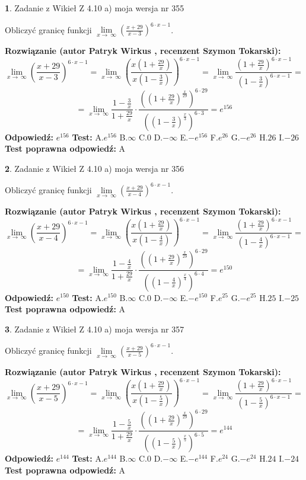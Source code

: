 \documentclass[12pt, a4paper]{article}
\theoremstyle{definition} %
\newtheorem{zad}{}
\newcommand{\zadStart}[1]{\begin{zad}#1\newline}
\newcommand{\zadStop}{\end{zad}}
\newcommand{\rozwStart}[2]{\noindent \textbf{Rozwiązanie (autor #1 , recenzent #2): }\newline}
\newcommand{\rozwStop}{\newline}
\newcommand{\odpStart}{\noindent \textbf{Odpowiedź:}\newline}
\newcommand{\odpStop}{\newline}
\newcommand{\testStart}{\noindent \textbf{Test:}\newline}
\newcommand{\testStop}{\newline}
\newcommand{\kluczStart}{\noindent \textbf{Test poprawna odpowiedź:}\newline}
\newcommand{\kluczStop}{\newline}
\begin{document}
\zadStart{Zadanie z Wikieł Z 4.10 a) moja wersja nr 355}

Obliczyć granicę funkcji  $\lim\limits_{x\to\ \infty}(\frac{x+29}{x-3})^{6\cdot x-1}$.
\zadStop
\rozwStart{Patryk Wirkus}{Szymon Tokarski}
$$\lim\limits_{x\to\ \infty}(\frac{x+29}{x-3})^{6\cdot x-1} = \lim\limits_{x\to\ \infty}(\frac{x(1+\frac{29}{x})}{x(1-\frac{3}{x})})^{6\cdot x-1}=\lim\limits_{x\to\ \infty}\frac{(1+\frac{29}{x})^{6\cdot x-1}}{(1-\frac{3}{x})^{6\cdot x-1}}=$$
$$=\lim\limits_{x\to\ \infty}\frac{1-\frac{3}{x}}{1+\frac{29}{x}}\cdot\frac{((1+\frac{29}{x})^{\frac{x}{29}})^{6\cdot29}}{((1-\frac{3}{x})^{\frac{x}{3}})^{6\cdot3}}=e^{156}$$
\rozwStop
\odpStart
$e^{156}$
\odpStop
\testStart
A.$e^{156}$ B.$\infty$ C.$0$ D.$-\infty$ E.$-e^{156}$
F.$e^{26}$ G.$-e^{26}$
H.$26$
I.$-26$
\testStop
\kluczStart
A
\kluczStop



\zadStart{Zadanie z Wikieł Z 4.10 a) moja wersja nr 356}

Obliczyć granicę funkcji  $\lim\limits_{x\to\ \infty}(\frac{x+29}{x-4})^{6\cdot x-1}$.
\zadStop
\rozwStart{Patryk Wirkus}{Szymon Tokarski}
$$\lim\limits_{x\to\ \infty}(\frac{x+29}{x-4})^{6\cdot x-1} = \lim\limits_{x\to\ \infty}(\frac{x(1+\frac{29}{x})}{x(1-\frac{4}{x})})^{6\cdot x-1}=\lim\limits_{x\to\ \infty}\frac{(1+\frac{29}{x})^{6\cdot x-1}}{(1-\frac{4}{x})^{6\cdot x-1}}=$$
$$=\lim\limits_{x\to\ \infty}\frac{1-\frac{4}{x}}{1+\frac{29}{x}}\cdot\frac{((1+\frac{29}{x})^{\frac{x}{29}})^{6\cdot29}}{((1-\frac{4}{x})^{\frac{x}{4}})^{6\cdot4}}=e^{150}$$
\rozwStop
\odpStart
$e^{150}$
\odpStop
\testStart
A.$e^{150}$ B.$\infty$ C.$0$ D.$-\infty$ E.$-e^{150}$
F.$e^{25}$ G.$-e^{25}$
H.$25$
I.$-25$
\testStop
\kluczStart
A
\kluczStop



\zadStart{Zadanie z Wikieł Z 4.10 a) moja wersja nr 357}

Obliczyć granicę funkcji  $\lim\limits_{x\to\ \infty}(\frac{x+29}{x-5})^{6\cdot x-1}$.
\zadStop
\rozwStart{Patryk Wirkus}{Szymon Tokarski}
$$\lim\limits_{x\to\ \infty}(\frac{x+29}{x-5})^{6\cdot x-1} = \lim\limits_{x\to\ \infty}(\frac{x(1+\frac{29}{x})}{x(1-\frac{5}{x})})^{6\cdot x-1}=\lim\limits_{x\to\ \infty}\frac{(1+\frac{29}{x})^{6\cdot x-1}}{(1-\frac{5}{x})^{6\cdot x-1}}=$$
$$=\lim\limits_{x\to\ \infty}\frac{1-\frac{5}{x}}{1+\frac{29}{x}}\cdot\frac{((1+\frac{29}{x})^{\frac{x}{29}})^{6\cdot29}}{((1-\frac{5}{x})^{\frac{x}{5}})^{6\cdot5}}=e^{144}$$
\rozwStop
\odpStart
$e^{144}$
\odpStop
\testStart
A.$e^{144}$ B.$\infty$ C.$0$ D.$-\infty$ E.$-e^{144}$
F.$e^{24}$ G.$-e^{24}$
H.$24$
I.$-24$
\testStop
\kluczStart
A
\kluczStop
\end{document}
